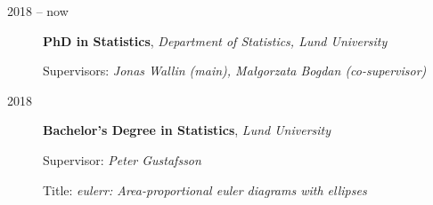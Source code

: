 \documentclass[
  10pt,
  headsepline=true,
  english,
  DIV=12
]{scrartcl}
\renewcommand*{%
  \mkbibnamegiven
}[1]{\ifitemannotation{highlight}{\textbf{#1}}{#1}}
\renewcommand*{%
  \mkbibnamefamily
}[1]{\ifitemannotation{highlight}{\textbf{#1}}{#1}}
\begin{document}
\begin{description}
  \item[2018 -- now] {
    \textbf{PhD in Statistics}, \emph{Department of Statistics, Lund
      University}

    Supervisors: \emph{Jonas Wallin (main), Małgorzata Bogdan (co-supervisor)}
    }

  \item[2018] {
    \textbf{Bachelor's Degree in Statistics}, \emph{Lund University}

    Supervisor: \emph{Peter Gustafsson}

    Title: \emph{eulerr: Area-proportional euler diagrams with ellipses}
    }






\end{description}





\end{document}
